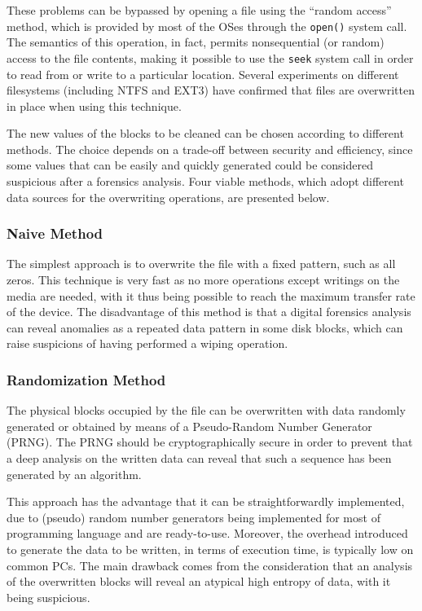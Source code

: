 \documentclass[conference]{IEEEtran}
\begin{document}
These problems can be bypassed by opening a file using the ``random access'' method, which is provided by most of the OSes through the \verb=open()= system call. The semantics of this operation, in fact, permits nonsequential (or random) access to the file contents, making it possible to use the \verb=seek= system call in order to read from or write to a particular location.
Several experiments on different filesystems (including NTFS and EXT3) have confirmed that files are overwritten in place when using this technique.

The new values of the blocks to be cleaned can be chosen according to different methods. The choice depends on a trade-off between security and efficiency, since some values that can be easily and quickly generated could be considered suspicious after a forensics analysis. Four viable methods, which adopt different data sources for the overwriting operations, are presented below.

\subsubsection{Naive Method}
The simplest approach is to overwrite the file with a fixed pattern, such as all zeros. This technique is very fast as no more operations except writings on the media are needed, with it thus being possible to reach the maximum transfer rate of the device. The disadvantage of this method is that a digital forensics analysis can reveal anomalies as a repeated data pattern in some disk blocks, which can raise suspicions of having performed a wiping operation.

\subsubsection{Randomization Method}
The physical blocks occupied by the file can be overwritten with data randomly generated or obtained by means of a Pseudo-Random Number Generator (PRNG). The PRNG should be cryptographically secure in order to prevent that a deep analysis on the written data can reveal that such a sequence has been generated by an algorithm.

\noindent This approach has the advantage that it can be straightforwardly implemented, due to (pseudo) random number generators being implemented for most of programming language and are ready-to-use. Moreover, the overhead introduced to generate the data to be written, in terms of execution time, is typically low on common PCs. The main drawback comes from the consideration that an analysis of the overwritten blocks will reveal an atypical high entropy of data, with it being suspicious.
\end{document}
